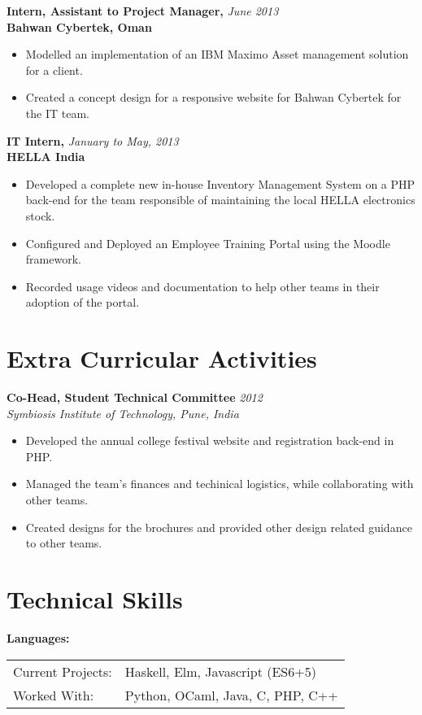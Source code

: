 \documentclass[a4paper,overlapped]{res}
\begin{document}
\begin{resume}
  \textbf{Intern, Assistant to Project Manager,}  \hfill \textit{June 2013}\\
  \textbf{Bahwan Cybertek, Oman}
  \begin{itemize}
  \item Modelled an implementation of an IBM Maximo Asset management 
    solution for a client. 
  \item Created a concept design for a responsive website for Bahwan Cybertek 
    for the IT team. 
  \end{itemize}

  \textbf{IT Intern,} \hfill \textit{January to May, 2013}\\
  \textbf{HELLA India}
  \begin{itemize}
  \item Developed a complete new in-house Inventory Management System on a PHP
    back-end for the team responsible of maintaining the local HELLA electronics stock.
  \item Configured and Deployed an Employee Training Portal using the
    Moodle framework.
  \item Recorded usage videos and documentation to help other teams in their
    adoption of the portal.
  \end{itemize}

  \section{Extra Curricular Activities}  

  \textbf{Co-Head, Student Technical Committee}   \hfill \textit{2012} \\
  \textit{Symbiosis Institute of Technology, Pune, India}
  \begin{itemize}
  \item Developed the annual college festival website and registration back-end
    in PHP.
  \item Managed the team's finances and techinical logistics, while collaborating 
    with other teams.
  \item Created designs for the brochures and provided other design related guidance to
    other teams.
  \end{itemize}

  \section{Technical Skills} 
  \textbf{Languages:} \\ 
  \begin{tabular}{l l}
    Current Projects: & Haskell, Elm, Javascript (ES6+5) \\ 
    Worked With: & Python, OCaml, Java, C, PHP, C++ \\
  \end{tabular}\\


\end{resume}
\end{document}
